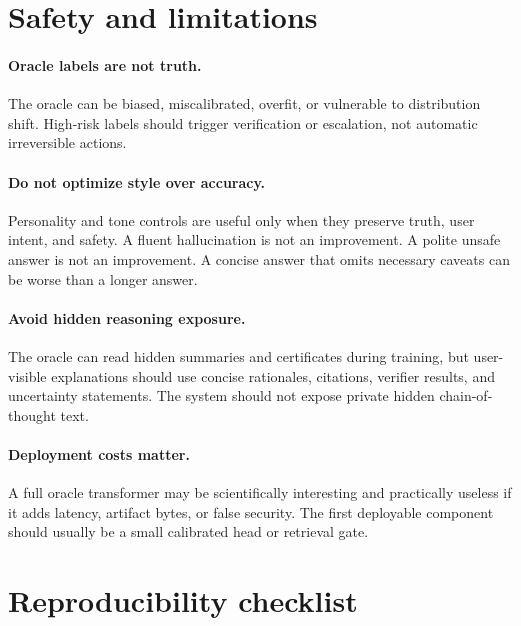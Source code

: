 \documentclass[11pt]{article}
\theoremstyle{definition}
\theoremstyle{remark}
\numberwithin{equation}{section}
\begin{document}
\section{Safety and limitations}

\paragraph{Oracle labels are not truth.}  The oracle can be biased, miscalibrated, overfit, or vulnerable to distribution shift.  High-risk labels should trigger verification or escalation, not automatic irreversible actions.

\paragraph{Do not optimize style over accuracy.}  Personality and tone controls are useful only when they preserve truth, user intent, and safety.  A fluent hallucination is not an improvement.  A polite unsafe answer is not an improvement.  A concise answer that omits necessary caveats can be worse than a longer answer.

\paragraph{Avoid hidden reasoning exposure.}  The oracle can read hidden summaries and certificates during training, but user-visible explanations should use concise rationales, citations, verifier results, and uncertainty statements.  The system should not expose private hidden chain-of-thought text.

\paragraph{Deployment costs matter.}  A full oracle transformer may be scientifically interesting and practically useless if it adds latency, artifact bytes, or false security.  The first deployable component should usually be a small calibrated head or retrieval gate.

\section{Reproducibility checklist}
\end{document}
